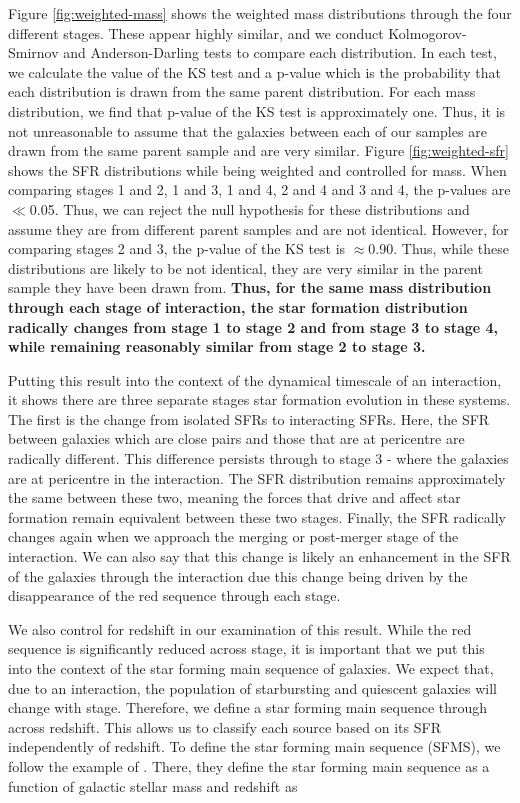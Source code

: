 \documentclass[fleqn,usenatbib]{mnras}
\begin{document}
Figure \ref{fig:weighted-mass} shows the weighted mass distributions through the four different stages. These appear highly similar, and we conduct Kolmogorov-Smirnov \citep[KS-test;][]{an1933sulla} and Anderson-Darling \citep[AD-test;][]{AD_paper} tests to compare each distribution. In each test, we calculate the value of the KS test and a p-value which is the probability that each distribution is drawn from the same parent distribution. For each mass distribution, we find that p-value of the KS test is approximately one. Thus, it is not unreasonable to assume that the galaxies between each of our samples are drawn from the same parent sample and are very similar. Figure \ref{fig:weighted-sfr} shows the SFR distributions while being weighted and controlled for mass. When comparing stages 1 and 2, 1 and 3, 1 and 4, 2 and 4 and 3 and 4, the p-values are $\ll$0.05. Thus, we can reject the null hypothesis for these distributions and assume they are from different parent samples and are not identical. However, for comparing stages 2 and 3, the p-value of the KS test is $\approx$0.90. Thus, while these distributions are likely to be not identical, they are very similar in the parent sample they have been drawn from. \textbf{Thus, for the same mass distribution through each stage of interaction, the star formation distribution radically changes from stage 1 to stage 2 and from stage 3 to stage 4, while remaining reasonably similar from stage 2 to stage 3.}

Putting this result into the context of the dynamical timescale of an interaction, it shows there are three separate stages star formation evolution in these systems. The first is the change from isolated SFRs to interacting SFRs. Here, the SFR between galaxies which are close pairs and those that are at pericentre are radically different. This difference persists through to stage 3 - where the galaxies are at pericentre in the interaction. The SFR distribution remains approximately the same between these two, meaning the forces that drive and affect star formation remain equivalent between these two stages. Finally, the SFR radically changes again when we approach the merging or post-merger stage of the interaction. We can also say that this change is likely an enhancement in the SFR of the galaxies through the interaction due this change being driven by the disappearance of the red sequence through each stage.

We also control for redshift in our examination of this result. While the red sequence is significantly reduced across stage, it is important that we put this into the context of the star forming main sequence of galaxies. We expect that, due to an interaction, the population of starbursting and quiescent galaxies will change with stage. Therefore, we define a star forming main sequence through across redshift. This allows us to classify each source based on its SFR independently of redshift. To define the star forming main sequence (SFMS), we follow the example of \citet{2019MNRAS.484.4360A}. There, they define the star forming main sequence as a function of galactic stellar mass and redshift as
\end{document}
